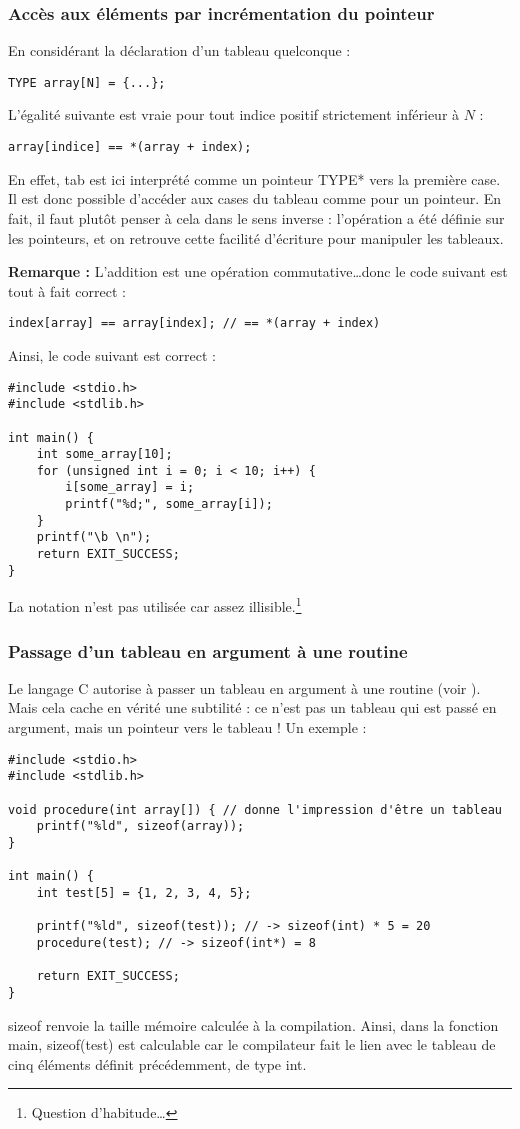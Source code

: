 \documentclass[../../../main.tex]{subfiles}
\begin{document}
\subsubsection{Accès aux éléments par incrémentation du pointeur}
\label{ssub:acc_s_aux_l_ments_par_incr_mentation_du_pointeur}
En considérant la déclaration d'un tableau quelconque :
\begin{verbatim}
TYPE array[N] = {...};
\end{verbatim}
L'égalité suivante est vraie pour tout indice positif strictement inférieur à $N$ :
\begin{verbatim}
array[indice] == *(array + index);
\end{verbatim}
En effet, \textsf{tab} est ici interprété comme un pointeur \textsf{TYPE*} vers la première case. Il est donc possible d'accéder aux cases du tableau comme pour un pointeur. En fait, il faut plutôt penser à cela dans le sens inverse : l'opération a été définie sur les pointeurs, et on retrouve cette facilité d'écriture pour manipuler les tableaux.
 
\textbf{Remarque :} L'addition est une opération commutative\dots donc le code suivant est tout à fait correct :
\begin{verbatim}
index[array] == array[index]; // == *(array + index)
\end{verbatim}
Ainsi, le code suivant est correct :
\begin{verbatim}
#include <stdio.h>
#include <stdlib.h>

int main() {
	int some_array[10];
	for (unsigned int i = 0; i < 10; i++) {
		i[some_array] = i;
		printf("%d;", some_array[i]);
	}
	printf("\b \n");
	return EXIT_SUCCESS;
}
\end{verbatim}
La notation n'est pas utilisée car assez illisible.\footnote{Question d'habitude\dots}
\subsubsection{Passage d'un tableau en argument à une routine}
\label{ssub:passage_d_un_tableau_en_argument_une_routine}
Le langage C autorise à passer un tableau en argument à une routine (voir ). Mais cela cache en vérité une subtilité : ce n'est pas un tableau qui est passé en argument, mais un pointeur vers le tableau !\newline
Un exemple :
\begin{verbatim}
#include <stdio.h>
#include <stdlib.h>

void procedure(int array[]) { // donne l'impression d'être un tableau
	printf("%ld", sizeof(array));
}

int main() {
	int test[5] = {1, 2, 3, 4, 5};
	
	printf("%ld", sizeof(test)); // -> sizeof(int) * 5 = 20
	procedure(test); // -> sizeof(int*) = 8

	return EXIT_SUCCESS;
}
\end{verbatim}
\textsf{sizeof} renvoie la taille mémoire calculée à la compilation. Ainsi, dans la fonction \textsf{main}, \textsf{sizeof(test)} est calculable car le compilateur fait le lien avec le tableau de cinq éléments définit précédemment, de type \textsf{int}.
 
\end{document}
